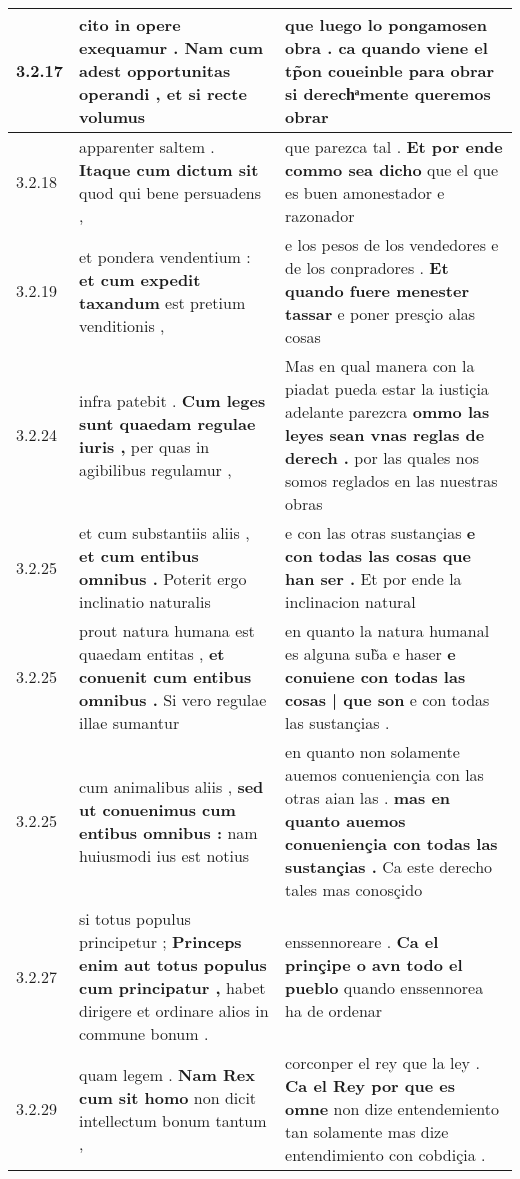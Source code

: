 \begin{tabular}{|p{1cm}|p{6.5cm}|p{6.5cm}|}
3.2.17 & cito in opere exequamur . \textbf{ Nam cum adest opportunitas operandi , } et si recte volumus & que luego lo pongamosen obra . \textbf{ ca quando viene el tp̃on coueinble para obrar } si derechͣmente queremos obrar \\\hline
3.2.18 & apparenter saltem . \textbf{ Itaque cum dictum sit } quod qui bene persuadens , & que parezca tal . \textbf{ Et por ende commo sea dicho } que el que es buen amonestador e razonador \\\hline
3.2.19 & et pondera vendentium : \textbf{ et cum expedit taxandum } est pretium venditionis , & e los pesos de los vendedores e de los conpradores . \textbf{ Et quando fuere menester tassar } e poner presçio alas cosas \\\hline
3.2.24 & infra patebit . \textbf{ Cum leges sunt quaedam regulae iuris , } per quas in agibilibus regulamur , & Mas en qual manera con la piadat pueda estar la iustiçia adelante parezcra \textbf{ ommo las leyes sean vnas reglas de derech . } por las quales nos somos reglados en las nuestras obras \\\hline
3.2.25 & et cum substantiis aliis , \textbf{ et cum entibus omnibus . } Poterit ergo inclinatio naturalis & e con las otras sustançias \textbf{ e con todas las cosas que han ser . } Et por ende la inclinacion natural \\\hline
3.2.25 & prout natura humana est quaedam entitas , \textbf{ et conuenit cum entibus omnibus . } Si vero regulae illae sumantur & en quanto la natura humanal es alguna sub̃a e haser \textbf{ e conuiene con todas las cosas | que son } e con todas las sustançias . \\\hline
3.2.25 & cum animalibus aliis , \textbf{ sed ut conuenimus cum entibus omnibus : } nam huiusmodi ius est notius & en quanto non solamente auemos conueniençia con las otras aian las . \textbf{ mas en quanto auemos conueniençia con todas las sustançias . } Ca este derecho tales mas conosçido \\\hline
3.2.27 & si totus populus principetur ; \textbf{ Princeps enim aut totus populus cum principatur , } habet dirigere et ordinare alios in commune bonum . & enssennoreare . \textbf{ Ca el prinçipe o avn todo el pueblo } quando enssennorea ha de ordenar \\\hline
3.2.29 & quam legem . \textbf{ Nam Rex cum sit homo } non dicit intellectum bonum tantum , & corconper el rey que la ley . \textbf{ Ca el Rey por que es omne } non dize entendemiento tan solamente mas dize entendimiento con cobdiçia . \\\hline

\end{tabular}
